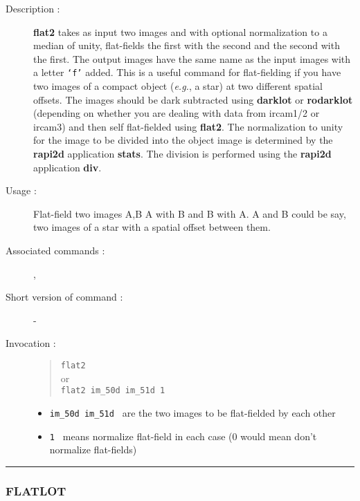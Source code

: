 \begin{description}

\item[Description :] {\bf flat2} takes as input two images and with
optional normalization to a median of unity, flat-fields the first with
the second and the second with the first.  The output images have the
same name as the input images with a letter {\tt `f'} added.  This is a
useful command for flat-fielding if you have two images of a compact
object (\emph{e.g.}, a star) at two different spatial offsets.  The
images should be dark subtracted using {\bf darklot} or {\bf rodarklot}
(depending on whether you are dealing with data from {\sc ircam1/2} or
{\sc ircam3}) and then self flat-fielded using {\bf flat2}. The
normalization to unity for the image to be divided into the object
image is determined by the {\bf rapi2d} application {\bf stats}.  The
division is performed using the {\bf rapi2d} application {\bf div}.

\item[Usage :] Flat-field two images A,B A with B and B with A.  
A and B could be say, two images of a star with a spatial offset between them.
\item[Associated commands :] {\tt {}}, 
{\tt {}}
\item[Short version of command :] -
\item[Invocation :]

\begin{quote}{\tt  flat2 }\\
or \\
{\tt flat2 im\_50d im\_51d 1 }
\end{quote}

\begin{itemize}

\item {\tt im\_50d im\_51d } are the two images to be flat-fielded by
each other
\item {\tt 1 } means normalize flat-field in each case
(0 would mean don't normalize flat-fields)
\end{itemize}

\end{description}

\hrule 
\subsubsection*{\label{FLATLOT}FLATLOT}


